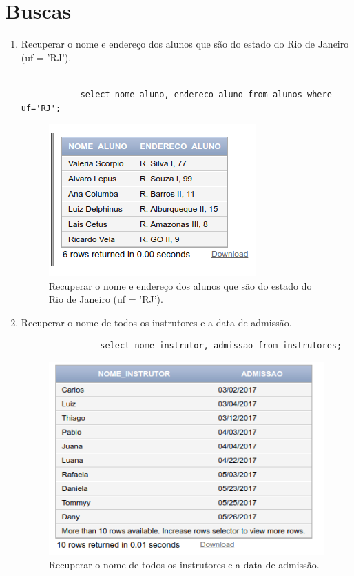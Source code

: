 \documentclass[
article,			%
11pt,				%
oneside,			%
a4paper,			%
english,			%
brazil,				%
sumario=tradicional
]{abntex2}
\begin{document}
		
	\section{Buscas}
	 
	 \begin{enumerate}
	 	\item  Recuperar o nome e endereço dos alunos que
	 	são do estado do Rio de Janeiro (uf = 'RJ').
	 	\begin{verbatim}
	 		
	 		select nome_aluno, endereco_aluno from alunos where uf='RJ';
	 	\end{verbatim}
	 		\begin{center}
	 		\begin{figure}[H]
	 			\centering
	 			\includegraphics[scale=0.5]{./at-06.png}
	 			\caption{Recuperar o nome e endereço dos alunos que
	 				são do estado do Rio de Janeiro (uf = 'RJ').}
	 			\label{rota-1}
	 		\end{figure}
	 	\end{center}
	 	
	 	\item  Recuperar o nome de todos os instrutores e a
	 	data de admissão.
	 	\begin{verbatim}
		     	select nome_instrutor, admissao from instrutores;
	 	\end{verbatim}
	 	\begin{center}
	 		\begin{figure}[H]
	 			\centering
	 			\includegraphics[scale=0.5]{./at-07.png}
	 			\caption{Recuperar o nome de todos os instrutores e a
	 				data de admissão.}
	 			\label{rota-1}
	 		\end{figure}
	 	\end{center}
	 	

\end{enumerate}
\end{document}
